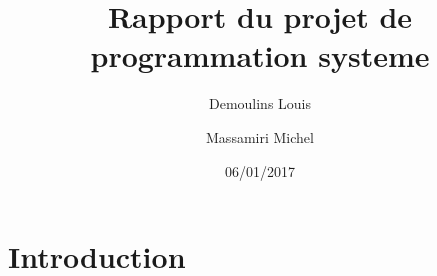 \documentclass{article}
\title{Rapport du projet de programmation systeme}
\date{06/01/2017}
\author{Demoulins Louis \and Massamiri Michel}
\begin{document}
\maketitle


\newpage
\section{Introduction}
	
\end{document}
